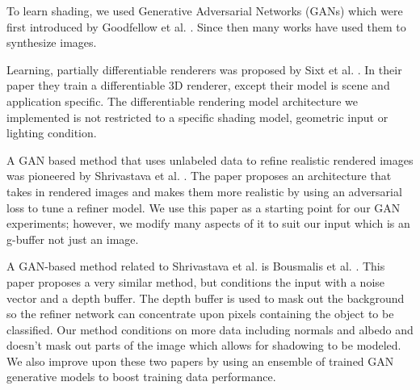 \documentclass[10pt,twocolumn,letterpaper]{article}
\begin{document}
To learn shading, we used Generative Adversarial Networks (GANs) which were first introduced by Goodfellow et al. \cite{goodfellow}. Since then many works have used them to synthesize images. 


Learning, partially differentiable renderers was proposed by Sixt et al. \cite{DBLP:journals/corr/SixtWL17}. In their paper they train a differentiable 3D renderer, except their model is scene and application specific. The differentiable rendering model architecture we implemented is not restricted to a specific shading model, geometric input or lighting condition.

A GAN based method that uses unlabeled data to refine realistic rendered images was pioneered by
Shrivastava et al. \cite{DBLP:journals/corr/ShrivastavaPTSW16}. The paper proposes an architecture that takes in rendered images and makes them more realistic by using an adversarial loss to tune a refiner model. We use this paper as a starting point for our GAN experiments; however, we modify many aspects of it to suit our input which is an g-buffer not just an image.

A GAN-based method related to Shrivastava et al. is Bousmalis et al. \cite{Bousmalis2016UnsupervisedPD}. This paper proposes a very similar method, but conditions the input with a noise vector and a depth buffer.  The depth buffer is used to mask out the background so the refiner network can concentrate upon pixels containing the object to be classified.  Our method conditions on more data including normals and albedo and doesn't mask out parts of the image which allows for shadowing to be modeled. We also improve upon these two papers by using an ensemble of trained GAN generative models to boost training data performance.

\end{document}

